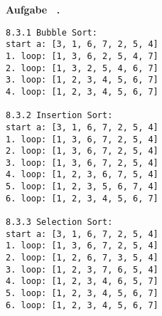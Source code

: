 \documentclass[a4paper,11pt]{article}             %
\def\vblatt{~}
\newcounter{aufgabe}
\newcommand{\Aufgabe}{\noindent\newline\addtocounter{aufgabe}{1}\textbf{Aufgabe \vblatt.\theaufgabe}\\
}
\begin{document}
\newpage
\Aufgabe
\begin{lstlisting}[style=javastyle]
8.3.1 Bubble Sort:
start a: [3, 1, 6, 7, 2, 5, 4]
1. loop: [1, 3, 6, 2, 5, 4, 7]
2. loop: [1, 3, 2, 5, 4, 6, 7]
3. loop: [1, 2, 3, 4, 5, 6, 7]
4. loop: [1, 2, 3, 4, 5, 6, 7]

8.3.2 Insertion Sort:
start a: [3, 1, 6, 7, 2, 5, 4]
1. loop: [1, 3, 6, 7, 2, 5, 4]
2. loop: [1, 3, 6, 7, 2, 5, 4]
3. loop: [1, 3, 6, 7, 2, 5, 4]
4. loop: [1, 2, 3, 6, 7, 5, 4]
5. loop: [1, 2, 3, 5, 6, 7, 4]
6. loop: [1, 2, 3, 4, 5, 6, 7]

8.3.3 Selection Sort:
start a: [3, 1, 6, 7, 2, 5, 4]
1. loop: [1, 3, 6, 7, 2, 5, 4]
2. loop: [1, 2, 6, 7, 3, 5, 4]
3. loop: [1, 2, 3, 7, 6, 5, 4]
4. loop: [1, 2, 3, 4, 6, 5, 7]
5. loop: [1, 2, 3, 4, 5, 6, 7]
6. loop: [1, 2, 3, 4, 5, 6, 7]
\end{lstlisting}
\end{document}
